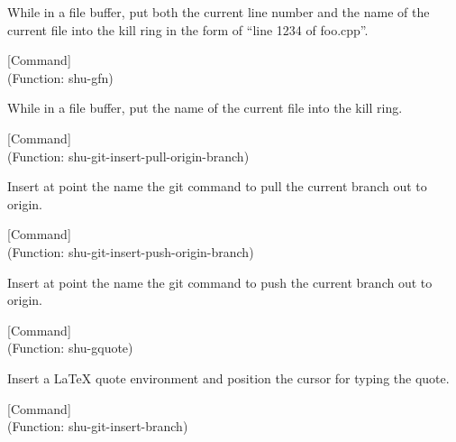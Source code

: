 \begin{doc-string}
While in a file buffer, put both the current line number and the name of the current
file into the kill ring in the form of ``line 1234 of foo.cpp''.
\end{doc-string}

\vspace{1em}
\noindent
{}
\usebox{\funcname}
 \hfill [Command]\\%
 (Function: shu-gfn)

\begin{doc-string}
While in a file buffer, put the name of the current file into the kill ring.
\end{doc-string}

\vspace{1em}
\noindent
{}
\usebox{\funcname}
 \hfill [Command]\\%
 (Function: shu-git-insert-pull-origin-branch)

\begin{doc-string}
Insert at point the name the git command to pull the current branch out
to origin.
\end{doc-string}

\vspace{1em}
\noindent
{}
\usebox{\funcname}
 \hfill [Command]\\%
 (Function: shu-git-insert-push-origin-branch)

\begin{doc-string}
Insert at point the name the git command to push the current branch out
to origin.
\end{doc-string}

\vspace{1em}
\noindent
{}
\usebox{\funcname}
 \hfill [Command]\\%
 (Function: shu-gquote)

\begin{doc-string}
Insert a LaTeX quote environment and position the cursor for typing the quote.
\end{doc-string}

\vspace{1em}
\noindent
{}
\usebox{\funcname}
 \hfill [Command]\\%
 (Function: shu-git-insert-branch)

